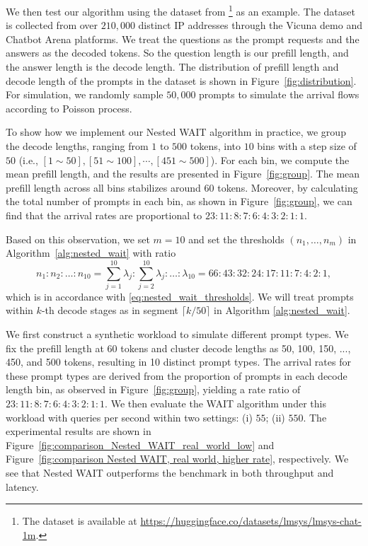 
We then test our algorithm using the dataset from \citet{zheng2023lmsys}\footnote{The dataset is available at \url{https://huggingface.co/datasets/lmsys/lmsys-chat-1m}.}  as an example. The dataset is collected from over $210,000$ distinct IP addresses through the Vicuna demo and Chatbot Arena platforms. We treat the questions as the prompt requests and the answers as the decoded tokens. So the question length is our prefill length, and the answer length is the decode length. The distribution of prefill length and decode length of the prompts in the dataset is shown in Figure~\ref{fig:distribution}. For simulation, we randomly sample $50,000$ prompts to simulate the arrival flows according to Poisson process. 

To show how we implement our Nested WAIT algorithm in practice, we group the decode lengths, ranging from $1$ to $500 $ tokens, into $10$ bins with a step size of $50$ (i.e., $[1\sim 50], [51\sim 100], \cdots, [451\sim 500]$). For each bin, we compute the mean prefill length, and the results are presented in Figure~\ref{fig:group}. The mean prefill length across all bins stabilizes around $60 $ tokens. Moreover, by calculating the total number of prompts in each bin, as shown in Figure~\ref{fig:group}, we can find that the arrival rates are proportional to $23 :11: 8 : 7 : 6 : 4 : 3 : 2 : 1 : 1 $.

Based on this observation, we set $m=10$ and set the thresholds $(n_1,\dots,n_m)$ in Algorithm~\ref{alg:nested_wait} with ratio
$$n_1:n_2:\dots:n_{10} = \sum_{j=1}^{10} \lambda_j : \sum_{j=2}^{10} \lambda_j :\dots: \lambda_{10} =66:43:32:24:17:11:7:4:2:1, $$ which is in accordance with \eqref{eq:nested_wait_thresholds}. We will treat prompts within $k$-th decode stages as in segment $\lceil k/50\rceil$ in Algorithm \ref{alg:nested_wait}.


We first construct a synthetic workload to simulate different prompt types. We fix the prefill length at 60 tokens and cluster decode lengths as 50, 100, 150, ..., 450, and 500 tokens, resulting in 10 distinct prompt types. The arrival rates for these prompt types are derived from the proportion of prompts in each decode length bin, as observed in Figure~\ref{fig:group}, yielding a rate ratio of $23 :11: 8 : 7 : 6 : 4 : 3 : 2 : 1 : 1 $. We then evaluate the WAIT algorithm under this workload with queries per second within two settings: (i) $55$; (ii) $550$. The experimental results are shown in Figure~\ref{fig:comparison_Nested_WAIT_real_world_low} and Figure~\ref{fig:comparison Nested WAIT, real world, higher rate}, respectively. We see that Nested WAIT outperforms the benchmark in both throughput and latency.

